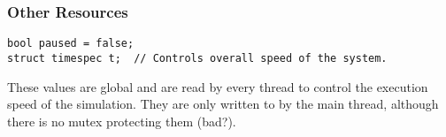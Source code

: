 \documentclass[titlepage]{article}
\begin{document}
\subsubsection{Other Resources}
\begin{lstlisting}
bool paused = false;
struct timespec t;  // Controls overall speed of the system.
\end{lstlisting}

These values are global and are read by every thread to control the
execution speed of the simulation. 
They are only written
to by the main thread, although there is no mutex protecting them (bad?).
\end{document}
